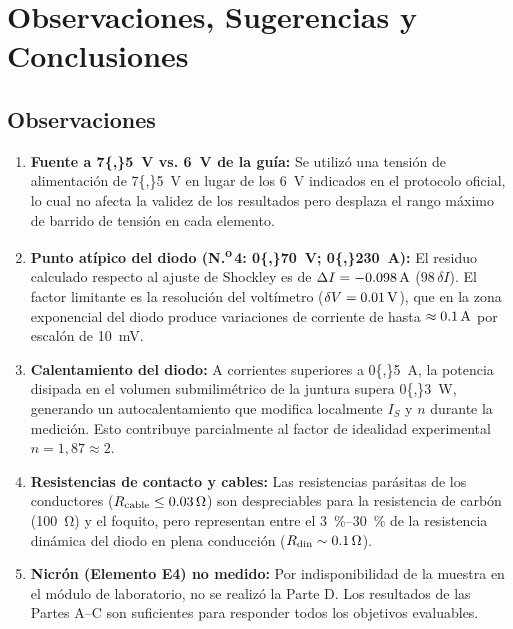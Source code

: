 
\section{Observaciones, Sugerencias y Conclusiones}
\label{sec:conclusiones}

\subsection{Observaciones}
\label{sec:observaciones}

\begin{enumerate}
    \item \textbf{Fuente a \qty{7{,}5}{\volt} vs. \qty{6}{\volt} de la guía:} Se utilizó una tensión de alimentación de \qty{7{,}5}{\volt} en lugar de los \qty{6}{\volt} indicados en el protocolo oficial, lo cual no afecta la validez de los resultados pero desplaza el rango máximo de barrido de tensión en cada elemento.

    \item \textbf{Punto atípico del diodo (\texorpdfstring{N.\textsuperscript{o}\,4}{Nro. 4}: \qty{0{,}70}{\volt}; \qty{0{,}230}{\ampere}):} El residuo calculado respecto al ajuste de Shockley es de $\Delta I = -\qty{0{,}098}{\ampere}$ ($98\,\delta I$). El factor limitante es la resolución del voltímetro ($\delta V = \qty{0{,}01}{\volt}$), que en la zona exponencial del diodo produce variaciones de corriente de hasta $\approx \qty{0{,}1}{\ampere}$ por escalón de \qty{10}{\milli\volt}.

    \item \textbf{Calentamiento del diodo:} A corrientes superiores a \qty{0{,}5}{\ampere}, la potencia disipada en el volumen submilimétrico de la juntura supera \qty{0{,}3}{\watt}, generando un autocalentamiento que modifica localmente $I_S$ y $n$ durante la medición. Esto contribuye parcialmente al factor de idealidad experimental $n = 1{,}87 \approx 2$.

    \item \textbf{Resistencias de contacto y cables:} Las resistencias parásitas de los conductores ($R_{\text{cable}} \le \qty{0{,}03}{\ohm}$) son despreciables para la resistencia de carbón (\qty{100}{\ohm}) y el foquito, pero representan entre el \qtyrange{3}{30}{\percent} de la resistencia dinámica del diodo en plena conducción ($R_{\text{din}} \sim \qty{0{,}1}{\ohm}$).

    \item \textbf{Nicrón (Elemento E4) no medido:} Por indisponibilidad de la muestra en el módulo de laboratorio, no se realizó la Parte D. Los resultados de las Partes A--C son suficientes para responder todos los objetivos evaluables.
\end{enumerate}

